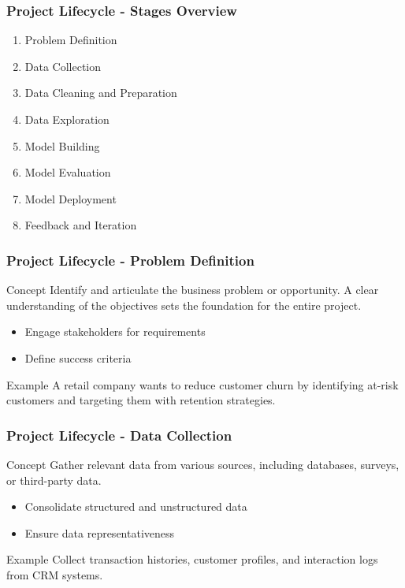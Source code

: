 \documentclass[aspectratio=169]{beamer}
\begin{document}
\begin{frame}[fragile]
    \frametitle{Project Lifecycle - Stages Overview}
    \begin{enumerate}
        \item Problem Definition
        \item Data Collection
        \item Data Cleaning and Preparation
        \item Data Exploration
        \item Model Building
        \item Model Evaluation
        \item Model Deployment
        \item Feedback and Iteration
    \end{enumerate}
\end{frame}

\begin{frame}[fragile]
    \frametitle{Project Lifecycle - Problem Definition}
    \begin{block}{Concept}
        Identify and articulate the business problem or opportunity. A clear understanding of the objectives sets the foundation for the entire project.
    \end{block}
    \begin{itemize}
        \item Engage stakeholders for requirements
        \item Define success criteria
    \end{itemize}
    \begin{block}{Example}
        A retail company wants to reduce customer churn by identifying at-risk customers and targeting them with retention strategies.
    \end{block}
\end{frame}

\begin{frame}[fragile]
    \frametitle{Project Lifecycle - Data Collection}
    \begin{block}{Concept}
        Gather relevant data from various sources, including databases, surveys, or third-party data.
    \end{block}
    \begin{itemize}
        \item Consolidate structured and unstructured data
        \item Ensure data representativeness
    \end{itemize}
    \begin{block}{Example}
        Collect transaction histories, customer profiles, and interaction logs from CRM systems.
    \end{block}
\end{frame}
\end{document}
